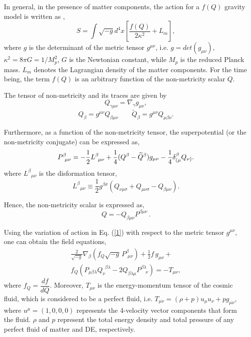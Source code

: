 \documentclass[prd,superscriptaddress,amsfonts,amssymb,amsmath,showpacs,twocolumn]{revtex4-2}
\begin{document}
In general, in the presence of matter components, the action for a $f(Q)$
gravity model is written as \cite{Q0,Q1}, 
\begin{equation}
S=\int \sqrt{-g}d^{4}x\left[ \frac{f(Q)}{2\kappa ^{2}}+L_{m}\right] ,
\label{1}
\end{equation}%
where $g$ is the determinant of the metric tensor $g^{\mu \nu }$, i.e. $%
g=det(g_{\mu \nu })$, $\kappa ^{2}=8\pi G=1/M_{p}^{2}$, $G$ is the Newtonian
constant, while $M_{p}$ is the reduced Planck mass. $L_{m}$ denotes the
Lagrangian density of the matter components. For the time being, the term $%
f(Q)$ is an arbitrary function of the non-metricity scalar $Q$.

The tensor of non-metricity and its traces are given by 
\begin{equation}
Q_{\gamma \mu \nu }=\nabla _{\gamma }g_{\mu \nu },  \label{4}
\end{equation}%
\begin{equation}
Q_{\beta }=g^{\mu \nu }Q_{\beta \mu \nu }\qquad \widetilde{Q}_{\beta
}=g^{\mu \nu }Q_{\mu \beta \nu }.  \label{5}
\end{equation}

Furthermore, as a function of the non-metricity tensor, the superpotential
(or the non-metricity conjugate) can be expressed as, 
\begin{equation}
P_{\,\,\,\mu \nu }^{\beta }=-\frac{1}{2}L_{\,\,\,\mu \nu }^{\beta }+\frac{1}{%
4}(Q^{\beta }-\widetilde{Q}^{\beta })g_{\mu \nu }-\frac{1}{4}\delta _{(\mu
}^{\beta }Q_{\nu )}.  \label{6}
\end{equation}%
where ${L^{\beta }}_{\mu \nu }$ is the disformation tensor,
\begin{equation}
{L^{\beta }}_{\mu \nu }\equiv \frac{1}{2}g^{\beta \sigma }\left( Q_{\nu
\mu \sigma }+Q_{\mu \nu \sigma }-Q_{\beta \mu \nu }\right) .
\end{equation}

Hence, the non-metricity scalar is expressed as, 
\begin{equation}
Q=-Q_{\beta \mu \nu }P^{\beta \mu \nu }\,.  \label{7}
\end{equation}

Using the variation of action in Eq. (\ref{1}) with respect to the metric tensor $%
g^{\mu \nu }$, one can obtain the field equations, 
\begin{multline}
\label{9}
\frac{2}{\sqrt{-g}}\nabla_{\beta}\left(f_{Q}\sqrt{-g}\,P^{\beta}_{\,\,\mu\nu}\right)+\frac{1}{2}f\,g_{\mu\nu}+\\
f_{Q}\left(P_{\mu\beta\lambda}Q_{\nu}^{\,\,\,\beta\lambda}-2Q_{\beta\lambda\mu}P^{\beta\lambda}_{\,\,\,\,\,\,\nu}\right)=- T_{\mu \nu},
\end{multline}
where $f_{Q}=\dfrac{df}{dQ}$. Moreover, $T_{\mu \nu }$ is the
energy-momentum tensor of the cosmic fluid, which is considered to be a
perfect fluid, i.e. $T_{\mu \nu }=(\rho +p)u_{\mu }u_{\nu }+pg_{\mu \nu }$,
where $u^{\mu }=(1,0,0,0)$ represents the 4-velocity vector components that form the fluid. $\rho $ and $p$ represent the total energy density and total pressure of any perfect fluid of matter and DE, respectively.
\end{document}
